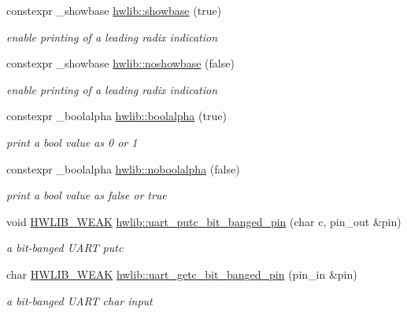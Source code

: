 \begin{DoxyCompactItemize}
constexpr \+\_\+showbase \hyperlink{hwlib-ostream_01-_01_copy_8hpp_a84adb21b2d054d3b70c6b26af5f44566}{hwlib\+::showbase} (true)
\begin{DoxyCompactList}\small\item\em enable printing of a leading radix indication \end{DoxyCompactList}\item 
constexpr \+\_\+showbase \hyperlink{hwlib-ostream_01-_01_copy_8hpp_af813ae25dc70ae85e2f06dcf81f8963b}{hwlib\+::noshowbase} (false)
\begin{DoxyCompactList}\small\item\em enable printing of a leading radix indication \end{DoxyCompactList}\item 
constexpr \+\_\+boolalpha \hyperlink{hwlib-ostream_01-_01_copy_8hpp_a499e8cd6806e66c4c425b64c9512a21c}{hwlib\+::boolalpha} (true)
\begin{DoxyCompactList}\small\item\em print a bool value as \textquotesingle{}0\textquotesingle{} or \textquotesingle{}1\textquotesingle{} \end{DoxyCompactList}\item 
constexpr \+\_\+boolalpha \hyperlink{hwlib-ostream_01-_01_copy_8hpp_a6fe77cc67d9850cb262eb6e15e37724d}{hwlib\+::noboolalpha} (false)
\begin{DoxyCompactList}\small\item\em print a bool value as \textquotesingle{}false\textquotesingle{} or \textquotesingle{}true\textquotesingle{} \end{DoxyCompactList}\item 
void \hyperlink{hwlib-defines_8hpp_a04be4340016df60d6636c1d1c6d94fc9}{H\+W\+L\+I\+B\+\_\+\+W\+E\+AK} \hyperlink{hwlib-ostream_01-_01_copy_8hpp_a10ed5b50cabfea49044e22331ac6f284}{hwlib\+::uart\+\_\+putc\+\_\+bit\+\_\+banged\+\_\+pin} (char c, pin\+\_\+out \&pin)
\begin{DoxyCompactList}\small\item\em a bit-\/banged U\+A\+RT putc \end{DoxyCompactList}\item 
char \hyperlink{hwlib-defines_8hpp_a04be4340016df60d6636c1d1c6d94fc9}{H\+W\+L\+I\+B\+\_\+\+W\+E\+AK} \hyperlink{hwlib-ostream_01-_01_copy_8hpp_a7dcb57f59ee55d80c76b7b7c09044a2f}{hwlib\+::uart\+\_\+getc\+\_\+bit\+\_\+banged\+\_\+pin} (pin\+\_\+in \&pin)
\begin{DoxyCompactList}\small\item\em a bit-\/banged U\+A\+RT char input \end{DoxyCompactList}\item 

\end{DoxyCompactItemize}
